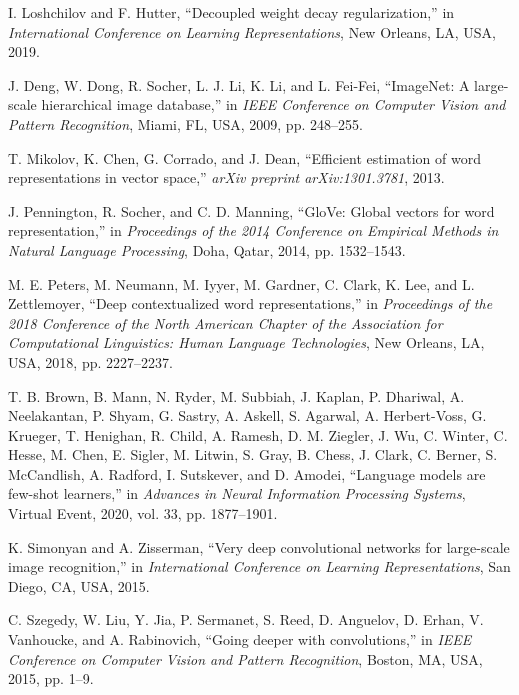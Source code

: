\documentclass[12pt,a4paper]{report}
\begin{document}
\begin{thebibliography}{99}
I. Loshchilov and F. Hutter, ``Decoupled weight decay regularization,'' in \textit{International Conference on Learning Representations}, New Orleans, LA, USA, 2019.

J. Deng, W. Dong, R. Socher, L. J. Li, K. Li, and L. Fei-Fei, ``ImageNet: A large-scale hierarchical image database,'' in \textit{IEEE Conference on Computer Vision and Pattern Recognition}, Miami, FL, USA, 2009, pp. 248--255.

T. Mikolov, K. Chen, G. Corrado, and J. Dean, ``Efficient estimation of word representations in vector space,'' \textit{arXiv preprint arXiv:1301.3781}, 2013.

J. Pennington, R. Socher, and C. D. Manning, ``GloVe: Global vectors for word representation,'' in \textit{Proceedings of the 2014 Conference on Empirical Methods in Natural Language Processing}, Doha, Qatar, 2014, pp. 1532--1543.

M. E. Peters, M. Neumann, M. Iyyer, M. Gardner, C. Clark, K. Lee, and L. Zettlemoyer, ``Deep contextualized word representations,'' in \textit{Proceedings of the 2018 Conference of the North American Chapter of the Association for Computational Linguistics: Human Language Technologies}, New Orleans, LA, USA, 2018, pp. 2227--2237.

T. B. Brown, B. Mann, N. Ryder, M. Subbiah, J. Kaplan, P. Dhariwal, A. Neelakantan, P. Shyam, G. Sastry, A. Askell, S. Agarwal, A. Herbert-Voss, G. Krueger, T. Henighan, R. Child, A. Ramesh, D. M. Ziegler, J. Wu, C. Winter, C. Hesse, M. Chen, E. Sigler, M. Litwin, S. Gray, B. Chess, J. Clark, C. Berner, S. McCandlish, A. Radford, I. Sutskever, and D. Amodei, ``Language models are few-shot learners,'' in \textit{Advances in Neural Information Processing Systems}, Virtual Event, 2020, vol. 33, pp. 1877--1901.

K. Simonyan and A. Zisserman, ``Very deep convolutional networks for large-scale image recognition,'' in \textit{International Conference on Learning Representations}, San Diego, CA, USA, 2015.

C. Szegedy, W. Liu, Y. Jia, P. Sermanet, S. Reed, D. Anguelov, D. Erhan, V. Vanhoucke, and A. Rabinovich, ``Going deeper with convolutions,'' in \textit{IEEE Conference on Computer Vision and Pattern Recognition}, Boston, MA, USA, 2015, pp. 1--9.


\end{thebibliography}
\end{document}
